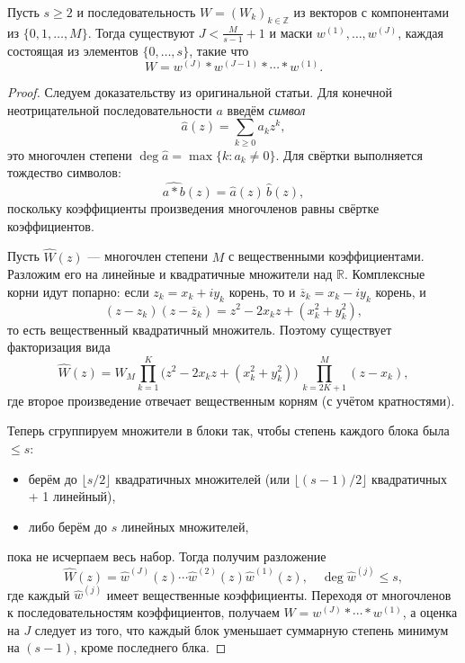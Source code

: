 \documentclass[../NDCNNAI_main.tex]{subfiles}
\begin{document}
\begin{theorem}
\label{thm:zhou_C}
Пусть $s\ge 2$ и последовательность $W=(W_k)_{k\in\mathbb Z}$ из векторов с компонентами из $\{0,1,\dots,M\}$.
Тогда существуют $J<\frac{M}{s-1}+1$ и маски $w^{(1)},\dots,w^{(J)}$,
каждая состоящая из элементов $\{0,\dots,s\}$, такие что
\[
W=w^{(J)}*w^{(J-1)}*\cdots*w^{(1)}.
\]  
\end{theorem}
\begin{proof}
Следуем доказательству из оригинальной статьи.
Для конечной неотрицательной последовательности $a$ введём \emph{символ}
\[
\widehat a(z)=\sum_{k\ge 0} a_k z^k,
\]
это многочлен степени $\deg \widehat a=\max\{k:a_k\ne 0\}$.
Для свёртки выполняется тождество символов:
\[
\widehat{a*b}(z)=\widehat a(z)\,\widehat b(z),
\]
поскольку коэффициенты произведения многочленов равны свёртке коэффициентов.

Пусть $\widehat W(z)$ --- многочлен степени $M$ с вещественными коэффициентами.
Разложим его на линейные и квадратичные множители над $\mathbb R$.
Комплексные корни идут попарно: если $z_k=x_k+iy_k$ корень, то и $\overline z_k=x_k-iy_k$ корень, и
\[
(z-z_k)(z-\overline z_k)=z^2-2x_k z + (x_k^2+y_k^2),
\]
то есть вещественный квадратичный множитель. Поэтому существует факторизация вида
\[
\widehat W(z)=W_M
\prod_{k=1}^{K}\big(z^2-2x_k z+(x_k^2+y_k^2)\big)\,
\prod_{k=2K+1}^{M}(z-x_k),
\]
где второе произведение отвечает вещественным корням (с учётом кратностями).

Теперь сгруппируем множители в блоки так, чтобы степень каждого блока была $\le s$:
\begin{itemize}
\item берём до $\lfloor s/2\rfloor$ квадратичных множителей (или $\lfloor (s-1)/2\rfloor$ квадратичных + 1 линейный),
\item либо берём до $s$ линейных множителей,
\end{itemize}
пока не исчерпаем весь набор. Тогда получим разложение
\[
\widehat W(z)=\widehat w^{(J)}(z)\cdots \widehat w^{(2)}(z)\widehat w^{(1)}(z),
\quad \deg \widehat w^{(j)}\le s,
\]
где каждый $\widehat w^{(j)}$ имеет вещественные коэффициенты.
Переходя от многочленов к последовательностям коэффициентов, получаем
$W=w^{(J)}*\cdots*w^{(1)}$,
а оценка на $J$ следует из того, что каждый блок уменьшает суммарную степень минимум на $(s-1)$, кроме последнего блка.  
\end{proof}
\end{document}
